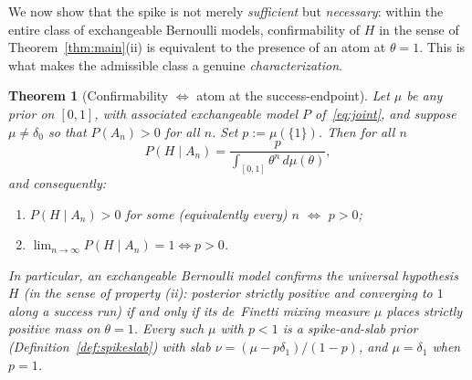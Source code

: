 \documentclass{amsart}
\newtheorem{theorem}{Theorem}
\theoremstyle{definition}
\begin{document}
We now show that the spike is not merely \emph{sufficient} but \emph{necessary}:
within the entire class of exchangeable Bernoulli models, confirmability of $H$
in the sense of Theorem~\ref{thm:main}(ii) is equivalent to the presence of an
atom at $\theta=1$. This is what makes the admissible class a genuine
\emph{characterization}.

\begin{theorem}[Confirmability $\iff$ atom at the success-endpoint]\label{thm:converse}
Let $\mu$ be any prior on $[0,1]$, with associated exchangeable model $P$
of~\eqref{eq:joint}, and suppose $\mu\ne\delta_0$ so that $P(A_n)>0$ for all $n$.
Set $p:=\mu(\{1\})$. Then for all $n$
\begin{equation}\label{eq:general}
  P(H\mid A_n)=\frac{p}{\int_{[0,1]}\theta^n\,d\mu(\theta)} ,
\end{equation}
and consequently:
\begin{enumerate}
\item[\textup{(a)}] $P(H\mid A_n)>0$ for some (equivalently every) $n$ $\iff$
$p>0$;
\item[\textup{(b)}] $\displaystyle\lim_{n\to\infty}P(H\mid A_n)=1 \iff p>0$.
\end{enumerate}
In particular, an exchangeable Bernoulli model confirms the universal hypothesis
$H$ (in the sense of property (ii): posterior strictly positive and converging to
$1$ along a success run) \emph{if and only if} its de~Finetti mixing measure
$\mu$ places strictly positive mass on $\theta=1$. Every such $\mu$ with $p<1$
is a spike-and-slab prior (Definition~\ref{def:spikeslab}) with slab
$\nu=(\mu-p\delta_1)/(1-p)$, and $\mu=\delta_1$ when $p=1$.
\end{theorem}
\end{document}
